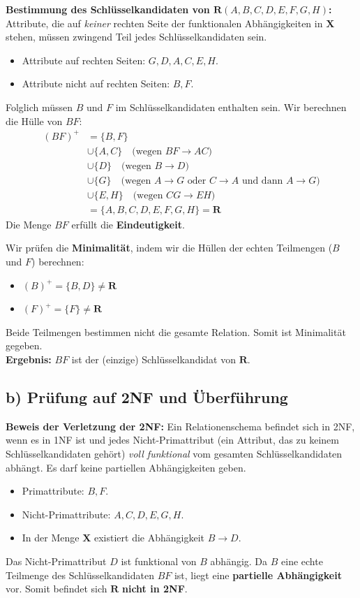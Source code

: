 \documentclass[12pt]{scrartcl}
\begin{document}
\textbf{Bestimmung des Schlüsselkandidaten von $\mathbf{R}(A, B, C, D, E, F, G, H)$:}
Attribute, die auf \textit{keiner} rechten Seite der funktionalen Abhängigkeiten in $\mathbf{X}$ stehen, müssen zwingend Teil jedes Schlüsselkandidaten sein.
\begin{itemize}
    \item Attribute auf rechten Seiten: $G, D, A, C, E, H$.
    \item Attribute nicht auf rechten Seiten: $B, F$.
\end{itemize}
Folglich müssen $B$ und $F$ im Schlüsselkandidaten enthalten sein. Wir berechnen die Hülle von $BF$:
\begin{align*}
    (BF)^+ &= \{B, F\} \\
    &\cup \{A, C\} \quad \text{(wegen } BF \rightarrow AC) \\
    &\cup \{D\} \quad \text{(wegen } B \rightarrow D) \\
    &\cup \{G\} \quad \text{(wegen } A \rightarrow G \text{ oder } C \rightarrow A \text{ und dann } A \rightarrow G) \\
    &\cup \{E, H\} \quad \text{(wegen } CG \rightarrow EH) \\
    &= \{A, B, C, D, E, F, G, H\} = \mathbf{R}
\end{align*}
Die Menge $BF$ erfüllt die \textbf{Eindeutigkeit}.

Wir prüfen die \textbf{Minimalität}, indem wir die Hüllen der echten Teilmengen ($B$ und $F$) berechnen:
\begin{itemize}
    \item $(B)^+ = \{B, D\} \neq \mathbf{R}$
    \item $(F)^+ = \{F\} \neq \mathbf{R}$
\end{itemize}
Beide Teilmengen bestimmen nicht die gesamte Relation. Somit ist Minimalität gegeben. \\
\textbf{Ergebnis:} $BF$ ist der (einzige) Schlüsselkandidat von $\mathbf{R}$.

\vspace{0.5cm}

\subsection*{b) Prüfung auf 2NF und Überführung}

\textbf{Beweis der Verletzung der 2NF:}
Ein Relationenschema befindet sich in 2NF, wenn es in 1NF ist und jedes Nicht-Primattribut (ein Attribut, das zu keinem Schlüsselkandidaten gehört) \textit{voll funktional} vom gesamten Schlüsselkandidaten abhängt. Es darf keine partiellen Abhängigkeiten geben.
\begin{itemize}
    \item Primattribute: $B, F$.
    \item Nicht-Primattribute: $A, C, D, E, G, H$.
    \item In der Menge $\mathbf{X}$ existiert die Abhängigkeit $B \rightarrow D$.
\end{itemize}
Das Nicht-Primattribut $D$ ist funktional von $B$ abhängig. Da $B$ eine echte Teilmenge des Schlüsselkandidaten $BF$ ist, liegt eine \textbf{partielle Abhängigkeit} vor. Somit befindet sich $\mathbf{R}$ \textbf{nicht in 2NF}.
\end{document}
